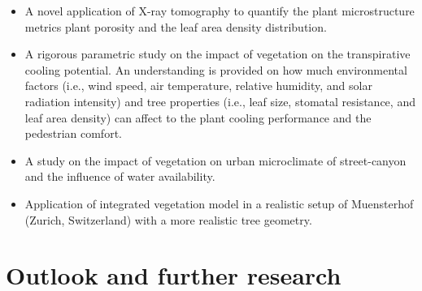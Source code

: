 \begin{itemize}
	\item A novel application of X-ray tomography to quantify the plant microstructure metrics plant porosity and the leaf area density distribution. 

	\item A rigorous parametric study on the impact of vegetation on the transpirative cooling potential. An understanding is provided on how much environmental factors (i.e., wind speed, air temperature, relative humidity, and solar radiation intensity) and tree properties (i.e., leaf size, stomatal resistance, and leaf area density) can affect to the plant cooling performance and the pedestrian comfort.
	 
	\item A study on the impact of vegetation on urban microclimate of street-canyon and the influence of water availability.
	
	\item Application of integrated vegetation model in a realistic setup of Muensterhof (Zurich, Switzerland) with a more realistic tree geometry. 
	
\end{itemize}


\section{Outlook and further research}

